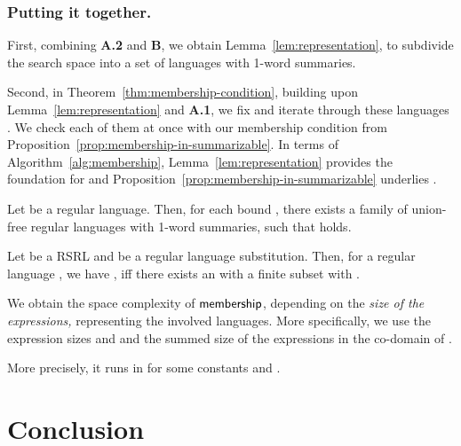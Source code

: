 \documentclass[envcountsame]{llncs}
\newcommand{\tEXPSPACE}{\complexityclass{2ExpSpace}}
\newcommand{\complexityclass}[1]{\ensuremath{\textsc{#1}}\xspace}
\newcommand{\membership}{\ensuremath{{\sf membership}}\xspace}
\newcommand{\RegularlyGeneratedLanguageSetAbbrev}{RSRL\xspace}
\begin{document}
\subsubsection{Putting it together.}
\label{sec:putting-it-together}
\begin{inparaenum}[]
\item First, combining \textbf{A.2} and \textbf{B}, we obtain
  Lemma~\ref{lem:representation}, to subdivide the search space  into a set  of languages  with
  1-word summaries.
\item Second, in Theorem~\ref{thm:membership-condition}, building upon
  Lemma~\ref{lem:representation} and \textbf{A.1}, we fix
   and iterate through these languages .
We check each of them at once with our membership condition from
  Proposition~\ref{prop:membership-in-summarizable}.
In terms of Algorithm~\ref{alg:membership},
  Lemma~\ref{lem:representation} provides the foundation for
   and
  Proposition~\ref{prop:membership-in-summarizable} underlies
  .
\end{inparaenum}


\begin{lemma}
  \label{lem:representation}
  Let  be a regular language.
Then, for each bound , there exists a family
   of union-free regular languages
   with 1-word summaries, such that
   holds.
\end{lemma}



\begin{theorem}
  \label{thm:membership-condition}
  Let  be a
  \RegularlyGeneratedLanguageSetAbbrev and  be a regular language substitution.
Then, for a regular language , we have
  ,
iff there exists an  with a finite subset  with
  .
\end{theorem}


We obtain the space complexity of \membership, depending on the
\emph{size of the expressions,} representing the involved languages.
More specifically, we use the expression sizes  and  and
the summed size
 of the
expressions in the co-domain of .


\begin{theorem}[ runs in \tEXPSPACE]
  \label{thm:membership-complexity}
  More precisely, it runs in  for some constants  and
  .
\end{theorem}

 \section{Conclusion}
\label{sec:conclusion}
\end{document}
